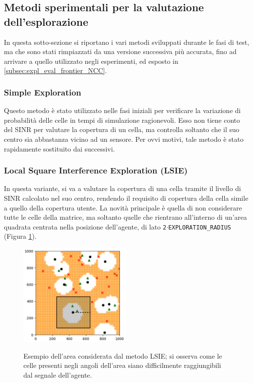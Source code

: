 \subsection{Metodi sperimentali per la valutazione dell'esplorazione} \label{subsec:experimental_expl_eval}
In questa sotto-sezione si riportano i vari metodi sviluppati durante le fasi di test, ma che sono stati rimpiazzati da una versione successiva più accurata, fino ad arrivare a quello utilizzato negli esperimenti, ed esposto in \ref{subsec:expl_eval_frontier_NCC}.

\subsubsection{Simple Exploration}
Questo metodo è stato utilizzato nelle fasi iniziali per verificare la variazione di probabilità delle celle in tempi di simulazione ragionevoli. 
Esso non tiene conto del SINR per valutare la copertura di un cella, ma controlla soltanto che il suo centro sia abbastanza vicino ad un sensore.
Per ovvi motivi, tale metodo è stato rapidamente sostituito dai successivi.

\subsubsection{Local Square Interference Exploration (LSIE)}
In questa variante, si va a valutare la copertura di una cella tramite il livello di SINR calcolato nel suo centro, rendendo il requisito di copertura della cella simile a quello della copertura utente.
La novità principale è quella di non considerare tutte le celle della matrice, ma soltanto quelle che rientrano all'interno di un'area quadrata centrata nella posizione dell'agente, di lato \texttt{2$\cdot$EXPLORATION\_RADIUS} (Figura \ref{fig:esempio_LSIE}).
\begin{figure}
    \centering
    \caption[Esempio dell'area valutata con il metodo LSIE]{Esempio dell'area considerata dal metodo LSIE; si osserva come le celle presenti negli angoli dell'area siano difficilmente raggiungibili dal segnale dell'agente.}
    \includegraphics[width=0.5\textwidth]{img/ch3/esempio_LSIE.jpg}
    \label{fig:esempio_LSIE}
\end{figure}

